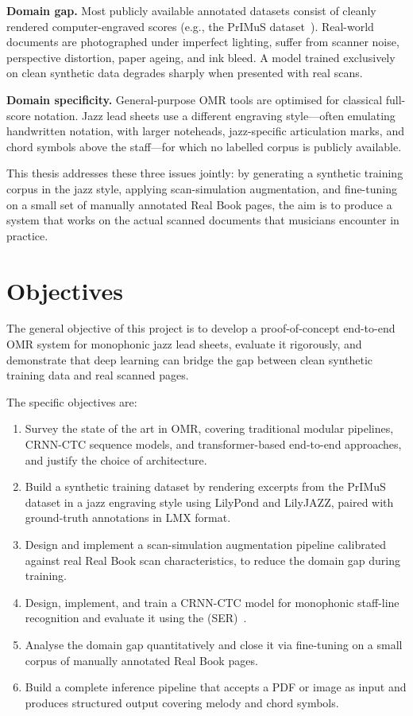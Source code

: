 \documentclass[11pt, a4paper]{report}
\begin{document}
\textbf{Domain gap.} Most publicly available annotated datasets consist of cleanly rendered computer-engraved scores (e.g., the PrIMuS dataset~\cite{PrIMuSDataset}). Real-world documents are photographed under imperfect lighting, suffer from scanner noise, perspective distortion, paper ageing, and ink bleed. A model trained exclusively on clean synthetic data degrades sharply when presented with real scans.

\textbf{Domain specificity.} General-purpose OMR tools are optimised for classical full-score notation. Jazz lead sheets use a different engraving style---often emulating handwritten notation, with larger noteheads, jazz-specific articulation marks, and chord symbols above the staff---for which no labelled corpus is publicly available.

This thesis addresses these three issues jointly: by generating a synthetic training corpus in the jazz style, applying scan-simulation augmentation, and fine-tuning on a small set of manually annotated Real Book pages, the aim is to produce a system that works on the actual scanned documents that musicians encounter in practice.

\section{Objectives}

The general objective of this project is to develop a proof-of-concept end-to-end OMR system for monophonic jazz lead sheets, evaluate it rigorously, and demonstrate that deep learning can bridge the gap between clean synthetic training data and real scanned pages.

The specific objectives are:

\begin{enumerate}
    \item Survey the state of the art in OMR, covering traditional modular pipelines, CRNN-CTC sequence models, and transformer-based end-to-end approaches, and justify the choice of architecture.
    \item Build a synthetic training dataset by rendering excerpts from the PrIMuS dataset in a jazz engraving style using LilyPond and LilyJAZZ, paired with ground-truth annotations in LMX format.
    \item Design and implement a scan-simulation augmentation pipeline calibrated against real Real Book scan characteristics, to reduce the domain gap during training.
    \item Design, implement, and train a CRNN-CTC model for monophonic staff-line recognition and evaluate it using the  (SER)~\cite{SymbolErrorRate}.
    \item Analyse the domain gap quantitatively and close it via fine-tuning on a small corpus of manually annotated Real Book pages.
    \item Build a complete inference pipeline that accepts a PDF or image as input and produces structured output covering melody and chord symbols.
\end{enumerate}
\end{document}
